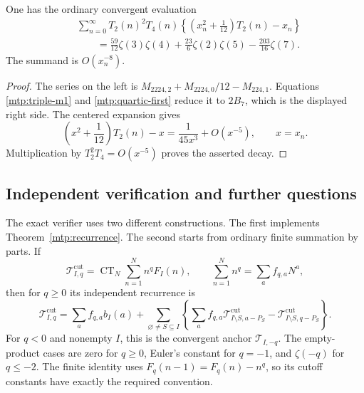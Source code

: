 \begin{corollary}
\label{mtp:short-quartic}
One has the ordinary convergent evaluation
\begin{equation}\label{mtp:short-quartic-formula}
 \boxed{\begin{aligned}
 &\sum_{n=0}^{\infty}T_2(n)^2T_4(n)
       \left\{\left(x_n^2+\frac1{12}\right)T_2(n)-x_n\right\}\\
 &\qquad=\frac{59}{12}\zeta(3)\zeta(4)
                +\frac{23}{6}\zeta(2)\zeta(5)-\frac{203}{16}\zeta(7).
 \end{aligned}}
\end{equation}
The summand is $O(x_n^{-8})$.
\end{corollary}

\begin{proof}
The series on the left is
$M_{2224,2}+M_{2224,0}/12-M_{224,1}$. Equations
\eqref{mtp:triple-m1} and \eqref{mtp:quartic-first} reduce it to $2B_7$,
which is the displayed right side. The centered expansion gives
\[
 \left(x^2+\frac1{12}\right)T_2(n)-x
       =\frac1{45x^3}+O(x^{-5}),\qquad x=x_n.
\]
Multiplication by $T_2^2T_4=O(x^{-5})$ proves the asserted decay.
\end{proof}

\subsection{Independent verification and further questions}

The exact verifier uses two different constructions. The first
implements Theorem~\ref{mtp:recurrence}. The second starts from
ordinary finite summation by parts. If
\[
 \mathcal T_{I,q}^{\mathrm{cut}}
  =\operatorname{CT}_N\sum_{n=1}^Nn^qF_I(n),\qquad
       \sum_{n=1}^Nn^q=\sum_a f_{q,a}N^a,
\]
then for $q\ge0$ its independent recurrence is
\begin{equation}\label{mtp:independent-cutoff}
 \mathcal T_{I,q}^{\mathrm{cut}}
   =\sum_a f_{q,a}b_I(a)
    +\sum_{\varnothing\ne S\subseteq I}
       \left\{\sum_a f_{q,a}
                    \mathcal T_{I\setminus S,a-P_S}^{\mathrm{cut}}
                    -\mathcal T_{I\setminus S,q-P_S}^{\mathrm{cut}}\right\}.
\end{equation}
For $q<0$ and nonempty $I$, this is the convergent anchor
$\mathcal T_{I,-q}$. The empty-product cases are zero for $q\ge0$,
Euler's constant for $q=-1$, and $\zeta(-q)$ for $q\le-2$.
The finite identity uses $F_q(n-1)=F_q(n)-n^q$, so its cutoff constants
have exactly the required convention.

